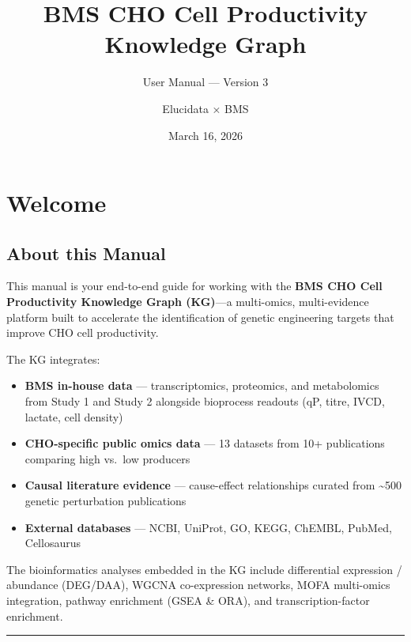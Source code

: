 \documentclass[
  letterpaper,
  oneside,
  open=any]{scrbook}
\title{BMS CHO Cell Productivity Knowledge Graph}
\subtitle{User Manual --- Version 3}
\author{Elucidata × BMS}
\date{March 16, 2026}
\providecommand{\tightlist}{%
  \setlength{\itemsep}{0pt}\setlength{\parskip}{0pt}}
\renewcommand*\contentsname{Table of contents}
\newcommand\contentsname{Table of contents}
\begin{document}
\frontmatter
\maketitle

\renewcommand*\contentsname{Table of contents}
{
\setcounter{tocdepth}{1}
\tableofcontents
}

\mainmatter
{}

\chapter{Welcome}\label{welcome}

\section{About this Manual}\label{about-this-manual}

This manual is your end-to-end guide for working with the \textbf{BMS
CHO Cell Productivity Knowledge Graph (KG)}---a multi-omics,
multi-evidence platform built to accelerate the identification of
genetic engineering targets that improve CHO cell productivity.

The KG integrates:

\begin{itemize}
\tightlist
\item
  \textbf{BMS in-house data} --- transcriptomics, proteomics, and
  metabolomics from Study 1 and Study 2 alongside bioprocess readouts
  (qP, titre, IVCD, lactate, cell density)
\item
  \textbf{CHO-specific public omics data} --- 13 datasets from 10+
  publications comparing high vs.~low producers
\item
  \textbf{Causal literature evidence} --- cause-effect relationships
  curated from \textasciitilde500 genetic perturbation publications
\item
  \textbf{External databases} --- NCBI, UniProt, GO, KEGG, ChEMBL,
  PubMed, Cellosaurus
\end{itemize}

The bioinformatics analyses embedded in the KG include differential
expression / abundance (DEG/DAA), WGCNA co-expression networks, MOFA
multi-omics integration, pathway enrichment (GSEA \& ORA), and
transcription-factor enrichment.

\begin{center}\rule{0.5\linewidth}{0.5pt}\end{center}
\end{document}
